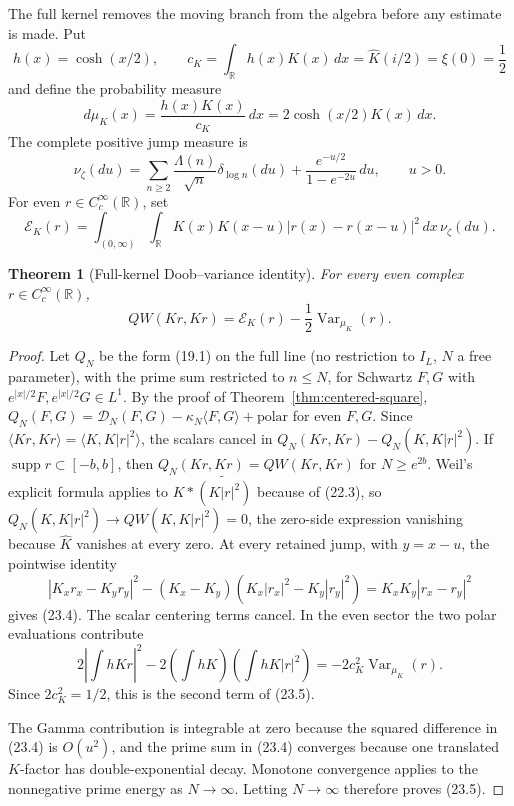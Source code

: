 \documentclass[11pt]{amsart}
\newtheorem{theorem}{Theorem}[section]
\theoremstyle{definition}
\theoremstyle{remark}
\begin{document}
The full kernel removes the moving branch from the algebra before any
estimate is made.  Put
\[
 h(x)=\cosh(x/2),\qquad
 c_K=\int_\mathbb R h(x)K(x)\,dx
     =\widehat K(i/2)=\xi(0)=\frac12
\tag{23.1}
\]
and define the probability measure
\[
 d\mu_K(x)=\frac{h(x)K(x)}{c_K}\,dx
          =2\cosh(x/2)K(x)\,dx.
\tag{23.2}
\]
The complete positive jump measure is
\[
 \nu_\zeta(du)
 =\sum_{n\ge2}\frac{\Lambda(n)}{\sqrt n}
       \delta_{\log n}(du)
  +\frac{e^{-u/2}}{1-e^{-2u}}\,du,
 \qquad u>0.
\tag{23.3}
\]
For even \(r\in C_c^\infty(\mathbb R)\), set
\[
 \mathscr E_K(r)
 =\int_{(0,\infty)}\!\int_\mathbb R
 K(x)K(x-u)|r(x)-r(x-u)|^2\,dx\,\nu_\zeta(du).
\tag{23.4}
\]

\begin{theorem}[Full-kernel Doob--variance identity]
\label{thm:doob-variance}
For every even complex \(r\in C_c^\infty(\mathbb R)\),
\[
 \boxed{
 QW(Kr,Kr)=\mathscr E_K(r)
 -\frac12\operatorname{Var}_{\mu_K}(r).}
\tag{23.5}
\]
\end{theorem}

\begin{proof}
Let \(Q_N\) be the form (19.1) on the full line (no restriction to
\(I_L\), \(N\) a free parameter), with the prime sum restricted to
\(n\le N\), for Schwartz \(F,G\) with
\(e^{|x|/2}F,e^{|x|/2}G\in L^1\).  By the proof of
Theorem~\ref{thm:centered-square},
\(Q_N(F,G)=\mathcal D_N(F,G)-\kappa_N\langle F,G\rangle+\text{polar}\)
for even \(F,G\).  Since \(\langle Kr,Kr\rangle=\langle K,K|r|^2\rangle\),
the scalars cancel in \(Q_N(Kr,Kr)-Q_N(K,K|r|^2)\).  If
\(\operatorname{supp}r\subset[-b,b]\), then \(Q_N(Kr,Kr)=QW(Kr,Kr)\) for
\(N\ge e^{2b}\).  Weil's explicit formula applies to
\(K*\widetilde{(K|r|^2)}\) because of (22.3), so
\(Q_N(K,K|r|^2)\to QW(K,K|r|^2)=0\), the zero-side expression vanishing
because \(\widehat K\) vanishes at every zero.  At every retained jump, with
\(y=x-u\), the pointwise identity
\[
 |K_xr_x-K_yr_y|^2
 -(K_x-K_y)(K_x|r_x|^2-K_y|r_y|^2)
 =K_xK_y|r_x-r_y|^2
\tag{23.6}
\]
gives (23.4).  The scalar centering terms cancel.  In the even sector the
two polar evaluations contribute
\[
 2\left|\int hKr\right|^2
 -2\left(\int hK\right)
    \left(\int hK|r|^2\right)
 =-2c_K^2\operatorname{Var}_{\mu_K}(r).
\tag{23.7}
\]
Since \(2c_K^2=1/2\), this is the second term of (23.5).

The Gamma contribution is integrable at zero because the squared
difference in (23.4) is \(O(u^2)\), and the prime sum in (23.4) converges
because one translated \(K\)-factor has double-exponential decay.
Monotone convergence applies to the nonnegative prime energy as
\(N\to\infty\).  Letting \(N\to\infty\) therefore proves (23.5).
\end{proof}
\end{document}
